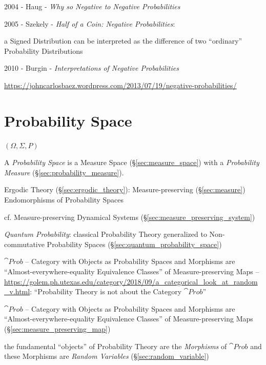 2004 - Haug - \emph{Why so Negative to Negative Probabilities}

2005 - Szekely - \emph{Half of a Coin: Negative Probabilities}:

a Signed Distribution can be interpreted as the difference of two ``ordinary''
Probability Distributions

2010 - Burgin - \emph{Interpretations of Negative Probabilities}

\url{https://johncarlosbaez.wordpress.com/2013/07/19/negative-probabilities/}



\section{Probability Space}\label{sec:probability_space}

$(\Omega, \Sigma, P)$

A \emph{Probability Space} is a Measure Space (\S\ref{sec:measure_space}) with a
\emph{Probability Measure} (\S\ref{sec:probability_measure}).

\fist Ergodic Theory (\S\ref{sec:ergodic_theory}): Measure-preserving
(\S\ref{sec:measure}) Endomorphisms of Probability Spaces

\fist cf. Measure-preserving Dynamical Systems
(\S\ref{sec:measure_preserving_system})

\fist \emph{Quantum Probability}: classical Probability Theory generalized to
Non-commutative Probability Spaces (\S\ref{sec:quantum_probability_space})

$\cat{Prob}$ -- Category with Objects as Probability Spaces and Morphisms are
``Almost-everywhere-equality Equivalence Classes'' of Measure-preserving Maps
--
\url{https://golem.ph.utexas.edu/category/2018/09/a_categorical_look_at_random_v.html}:
``Probability Theory is not about the Category $\cat{Prob}$''

$\cat{Prob}$ -- Category with Objects as Probability Spaces and Morphisms are
``Almost-everywhere-equality Equivalence Classes'' of Measure-preserving Maps
(\S\ref{sec:measure_preserving_map})

the fundamental ``objects'' of Probability Theory are the \emph{Morphisms} of
$\cat{Prob}$ and these Morphisms are \emph{Random Variables}
(\S\ref{sec:random_variable})



